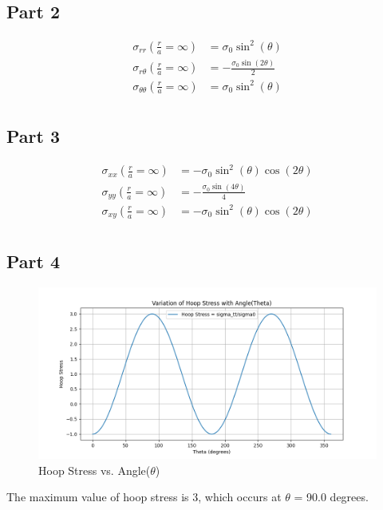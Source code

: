 \documentclass[12pt]{article} %
\begin{document}
\subsection*{Part 2}
\begin{align*}
    \sigma_{rr}(\frac{r}{a}=\infty ) &= \sigma_{0} \sin^{2}{\left(\theta \right)}\\
    \sigma_{r\theta}(\frac{r}{a}=\infty ) &= - \frac{\sigma_{0} \sin{\left(2 \theta \right)}}{2}\\
    \sigma_{\theta\theta}(\frac{r}{a}=\infty ) &= \sigma_{0} \sin^{2}{\left(\theta \right)}\\
\end{align*}
\subsection*{Part 3}
\begin{align*}
    \sigma_{xx}(\frac{r}{a}=\infty ) &= - \sigma_{0} \sin^{2}{\left(\theta \right)} \cos{\left(2 \theta \right)}\\
    \sigma_{yy}(\frac{r}{a}=\infty ) &= - \frac{\sigma_{0} \sin{\left(4 \theta \right)}}{4}\\
    \sigma_{xy}(\frac{r}{a}=\infty ) &= - \sigma_{0} \sin^{2}{\left(\theta \right)} \cos{\left(2 \theta \right)}\\
\end{align*}
\newpage
\subsection*{Part 4}
\begin{figure}[ht]
    \centering
    \includegraphics[width=1\textwidth]{Hoop Stress.png}
    \caption{Hoop Stress vs. Angle($\theta$)}
\end{figure}
The maximum value of hoop stress is 3, which occurs at $\theta$ = 90.0 degrees.
\end{document}
